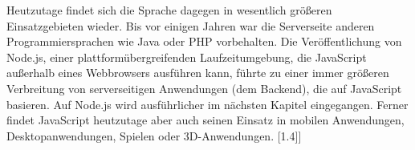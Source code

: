 Heutzutage findet sich die Sprache dagegen in wesentlich größeren Einsatzgebieten wieder. 
Bis vor einigen Jahren war die Serverseite anderen Programmiersprachen wie Java oder PHP vorbehalten. Die Veröffentlichung von Node.js, einer plattformübergreifenden Laufzeitumgebung, die JavaScript außerhalb eines Webbrowsers ausführen kann, führte zu einer immer größeren Verbreitung von serverseitigen Anwendungen (dem Backend), die auf JavaScript basieren. Auf Node.js wird ausführlicher im nächsten Kapitel eingegangen. 
Ferner findet JavaScript heutzutage aber auch seinen Einsatz in mobilen Anwendungen, Desktopanwendungen, Spielen oder 3D-Anwendungen. [1.4]]

